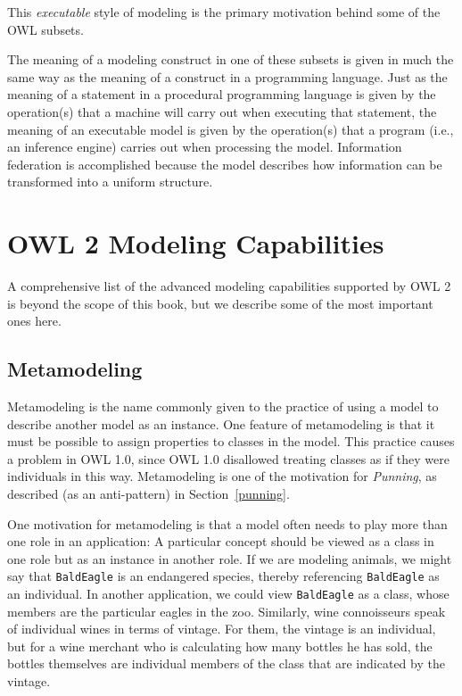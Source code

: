 This \emph{executable} style of modeling is the primary motivation behind some
of the OWL subsets.

The meaning of a modeling construct in one of these subsets is given in
much the same way as the meaning of a construct in a programming
language. Just as the meaning of a statement in a procedural programming
language is given by the operation(s) that a machine will carry out when
executing that statement, the meaning of an executable model is given by
the operation(s) that a program (i.e., an inference engine) carries out
when processing the model. Information federation is accomplished
because the model describes how information can be transformed into a
uniform structure.

\section{OWL 2 Modeling Capabilities}

A comprehensive list of the advanced modeling capabilities supported by
OWL 2 is beyond the scope of this book, but we describe some of the most
important ones here.

\subsection{Metamodeling}

Metamodeling is the name commonly given to the practice of using a model
to describe another model as an instance. One feature of metamodeling is
that it must be possible to assign properties to classes in the model.
This practice causes a problem in OWL 1.0, since OWL 1.0 disallowed
treating classes as if they were individuals in this way.  Metamodeling is one of the 
motivation for \emph{Punning}, as described (as an anti-pattern) in Section~\ref{punning}.

One motivation for metamodeling is that a model often needs to play more
than one role in an application: A particular concept should be viewed
as a class in one role but as an instance in another role. If we are
modeling animals, we might say that \texttt{BaldEagle} is an endangered species,
thereby referencing \texttt{BaldEagle} as an individual. In another application,
we could view \texttt{BaldEagle} as a class, whose members are the particular
eagles in the zoo. Similarly, wine connoisseurs speak of individual
wines in terms of vintage. For them, the vintage is an individual, but
for a wine merchant who is calculating how many bottles he has sold, the
bottles themselves are individual members of the class that are
indicated by the vintage.

